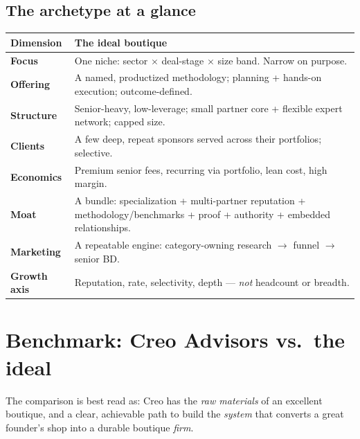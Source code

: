 \documentclass[11pt]{article}
\begin{document}
\subsection{The archetype at a glance}
\begin{center}
\renewcommand{\arraystretch}{1.3}\small
\begin{tabular}{>{\bfseries}p{3.0cm} p{11.0cm}}
\toprule
Dimension & The ideal boutique \\
\midrule
Focus & One niche: sector $\times$ deal-stage $\times$ size band. Narrow on purpose. \\
Offering & A named, productized methodology; planning + hands-on execution; outcome-defined. \\
Structure & Senior-heavy, low-leverage; small partner core + flexible expert network; capped size. \\
Clients & A few deep, repeat sponsors served across their portfolios; selective. \\
Economics & Premium senior fees, recurring via portfolio, lean cost, high margin. \\
Moat & A bundle: specialization + multi-partner reputation + methodology/benchmarks + proof + authority + embedded relationships. \\
Marketing & A repeatable engine: category-owning research $\to$ funnel $\to$ senior BD. \\
Growth axis & Reputation, rate, selectivity, depth --- \emph{not} headcount or breadth. \\
\bottomrule
\end{tabular}
\end{center}

\section{Benchmark: Creo Advisors vs.\ the ideal}
The comparison is best read as: Creo has the \emph{raw materials} of an excellent boutique,
and a clear, achievable path to build the \emph{system} that converts a great founder's shop
into a durable boutique \emph{firm}.
\end{document}
